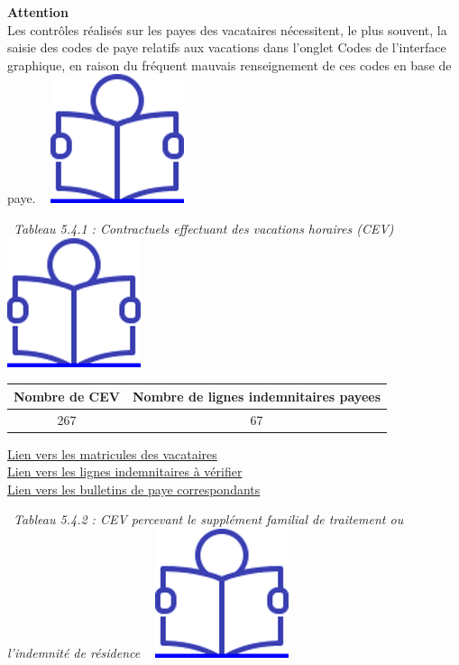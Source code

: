 \textbf{Attention}\\
Les contrôles réalisés sur les payes des vacataires nécessitent, le plus
souvent, la saisie des codes de paye relatifs aux vacations dans
l'onglet Codes de l'interface graphique, en raison du fréquent mauvais
renseignement de ces codes en base de paye. ~
\href{../Docs/Notices/fiche_onglet_codes.odt}{\includegraphics{icones/Notice.png}}

~\emph{Tableau 5.4.1 : Contractuels effectuant des vacations horaires
(CEV)} ~
\href{../Docs/Notices/fiche_CEV_horaires.odt}{\includegraphics{icones/Notice.png}}

\begin{longtable}[]{@{}cc@{}}
\toprule
Nombre de CEV & Nombre de lignes indemnitaires payees\tabularnewline
\midrule
\endhead
267 & 67\tabularnewline
\bottomrule
\end{longtable}

\href{../Bases/Reglementation/matricules.contractuels.et.vacations.csv}{Lien
vers les matricules des vacataires}\\
\href{../Bases/Reglementation/RI.et.vacations.csv}{Lien vers les lignes
indemnitaires à vérifier}\\
\href{../Bases/Reglementation/Paie_vac_contr.csv}{Lien vers les bulletins
de paye correspondants}

~\emph{Tableau 5.4.2 : CEV percevant le supplément familial de
traitement ou l'indemnité de résidence} ~
\href{../Docs/Notices/fiche_CEV_SFT.odt}{\includegraphics{icones/Notice.png}}

